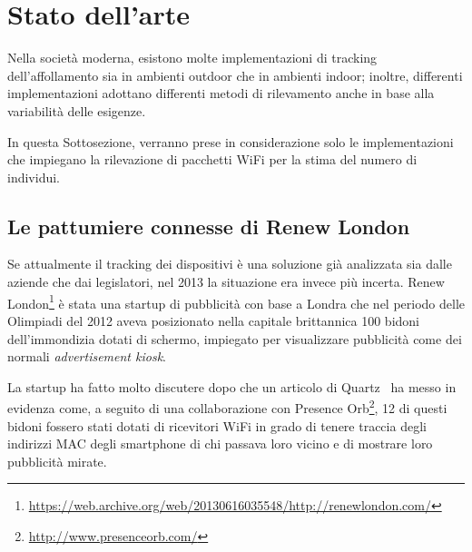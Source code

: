 \section{Stato dell'arte}




Nella società moderna, esistono molte implementazioni di tracking dell'affollamento sia in ambienti outdoor che in ambienti indoor;
inoltre, differenti implementazioni adottano differenti metodi di rilevamento anche in base alla variabilità delle esigenze.

In questa Sottosezione, verranno prese in considerazione solo le implementazioni che impiegano la rilevazione di pacchetti WiFi per la stima del numero di individui.

\subsection[Renew London \& Presence Orb]{Le pattumiere connesse di Renew London}

Se attualmente il tracking dei dispositivi è una soluzione già analizzata sia dalle aziende che dai legislatori, nel 2013 la situazione era invece più incerta.
Renew London\footnote{\url{https://web.archive.org/web/20130616035548/http://renewlondon.com/}} è stata una startup di pubblicità con base a Londra
che nel periodo delle Olimpiadi del 2012 aveva posizionato nella capitale brittannica 100 bidoni dell'immondizia dotati di schermo, impiegato per visualizzare pubblicità come dei normali \textit{advertisement kiosk}.

La startup ha fatto molto discutere dopo che un articolo di Quartz~\cite{Datoo2013} ha messo in evidenza come, a seguito di una collaborazione con Presence Orb\footnote{\url{http://www.presenceorb.com/}},
12 di questi bidoni fossero stati dotati di ricevitori WiFi in grado di tenere traccia degli indirizzi MAC degli smartphone di chi passava loro vicino e di mostrare loro pubblicità mirate.

